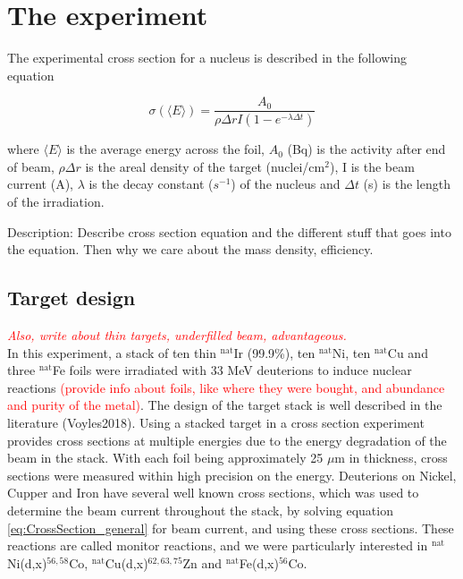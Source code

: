\documentclass[a4paper,11pt,twoside]{book}
\begin{document}


\section{The experiment}



The experimental cross section for a nucleus is described in the following equation

\begin{equation} \label{eq:CrossSection_general}
    \sigma(\langle E \rangle) = \frac{A_0}{\rho\Delta r I (1-e^{-\lambda \Delta t})}
\end{equation}



where $\langle E \rangle$ is the average energy across the foil, $A_0$ (Bq) is the activity after end of beam, $\rho \Delta r$ is the areal density of the target (nuclei/cm$^2$), I is the beam current (A), $\lambda$ is the decay constant ($s^{-1}$) of the nucleus and $\Delta t$ (s) is the length of the irradiation. %

Description: Describe cross section equation and the different stuff that goes into the equation. Then why we care about the mass density, efficiency. 



\subsection{Target design}
\textit{\textcolor{red}{Also, write about thin targets, underfilled beam, advantageous.}}\\

\noindent 
In this experiment, a stack of ten thin $^{\text{nat}}$Ir (99.9\%), ten $^{\text{nat}}$Ni, ten $^{\text{nat}}$Cu and three $^{\text{nat}}$Fe foils were irradiated with 33 MeV deuterions to induce nuclear reactions  \textcolor{red}{(provide info about foils, like where they were bought, and abundance and purity of the metal)}. The design of the target stack is well described in the literature (Voyles2018). Using a stacked target in a cross section experiment provides cross sections at multiple energies due to the energy degradation of the beam in the stack. With each foil being approximately 25 $\mu$m in thickness, cross sections were measured within high precision on the energy. Deuterions on Nickel, Cupper and Iron have several well known cross sections, which was used to determine the beam current throughout the stack, by solving equation \ref{eq:CrossSection_general} for beam current, and using these cross sections. These reactions are called monitor reactions, and we were particularly interested in $^{\text{nat}}$Ni(d,x)$^{56,58}$Co, $^{\text{nat}}$Cu(d,x)$^{62, 63, 75}$Zn and $^{\text{nat}}$Fe(d,x)$^{56}$Co.  \\ 
\end{document}
